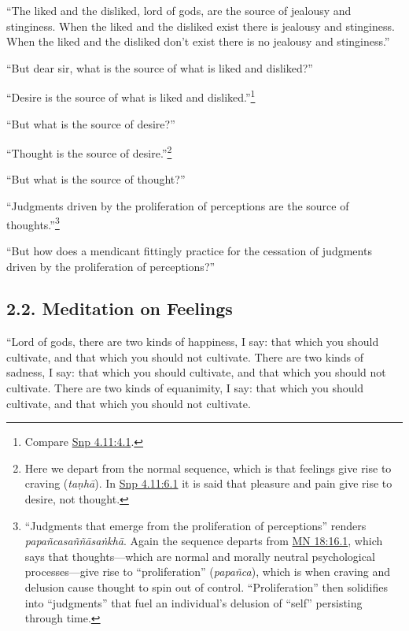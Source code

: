\documentclass[12pt,openany]{book}%
\begin{document}
“The liked and the disliked, lord of gods, are the source of jealousy and stinginess. When the liked and the disliked exist there is jealousy and stinginess. When the liked and the disliked don’t exist there is no jealousy and stinginess.” 

“But dear sir, what is the source of what is liked and disliked?” 

“Desire is the source of what is liked and disliked.”\footnote{Compare \href{https://suttacentral.net/snp4.11/en/sujato\#4.1}{Snp 4.11:4.1}. } 

“But what is the source of desire?” 

“Thought is the source of desire.”\footnote{Here we depart from the normal sequence, which is that feelings give rise to craving (\textit{\textsanskrit{taṇhā}}). In \href{https://suttacentral.net/snp4.11/en/sujato\#6.1}{Snp 4.11:6.1} it is said that pleasure and pain give rise to desire, not thought. } 

“But what is the source of thought?” 

“Judgments driven by the proliferation of perceptions are the source of thoughts.”\footnote{“Judgments that emerge from the proliferation of perceptions” renders \textit{\textsanskrit{papañcasaññāsaṅkhā}}. Again the sequence departs from \href{https://suttacentral.net/mn18/en/sujato\#16.1}{MN 18:16.1}, which says that thoughts—which are normal and morally neutral psychological processes—give rise to “proliferation” (\textit{\textsanskrit{papañca}}), which is when craving and delusion cause thought to spin out of control. “Proliferation” then solidifies into “judgments” that fuel an individual’s delusion of “self” persisting through time. } 

“But how does a mendicant fittingly practice for the cessation of judgments driven by the proliferation of perceptions?” 

\subsection*{2.2. Meditation on Feelings }

“Lord of gods, there are two kinds of happiness, I say: that which you should cultivate, and that which you should not cultivate. There are two kinds of sadness, I say: that which you should cultivate, and that which you should not cultivate. There are two kinds of equanimity, I say: that which you should cultivate, and that which you should not cultivate. 
\end{document}
